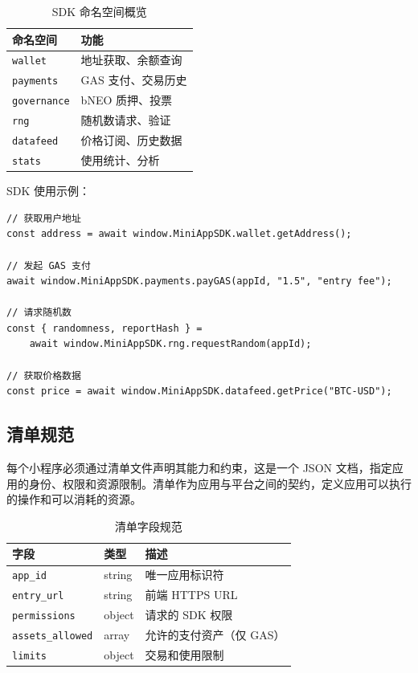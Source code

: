 \documentclass[11pt,a4paper]{article}
\begin{document}
\begin{table}[h]
\centering
\caption{SDK 命名空间概览}
\begin{tabular}{@{}lp{8cm}@{}}
\toprule
\textbf{命名空间} & \textbf{功能} \\
\midrule
\texttt{wallet} & 地址获取、余额查询 \\
\texttt{payments} & GAS 支付、交易历史 \\
\texttt{governance} & bNEO 质押、投票 \\
\texttt{rng} & 随机数请求、验证 \\
\texttt{datafeed} & 价格订阅、历史数据 \\
\texttt{stats} & 使用统计、分析 \\
\bottomrule
\end{tabular}
\label{tab:sdk-namespaces}
\end{table}

SDK 使用示例：

\begin{lstlisting}
// 获取用户地址
const address = await window.MiniAppSDK.wallet.getAddress();

// 发起 GAS 支付
await window.MiniAppSDK.payments.payGAS(appId, "1.5", "entry fee");

// 请求随机数
const { randomness, reportHash } =
    await window.MiniAppSDK.rng.requestRandom(appId);

// 获取价格数据
const price = await window.MiniAppSDK.datafeed.getPrice("BTC-USD");
\end{lstlisting}

\subsection{清单规范}

每个小程序必须通过清单文件声明其能力和约束，这是一个 JSON 文档，指定应用的身份、权限和资源限制。清单作为应用与平台之间的契约，定义应用可以执行的操作和可以消耗的资源。

\begin{table}[h]
\centering
\caption{清单字段规范}
\begin{tabular}{@{}llp{5cm}@{}}
\toprule
\textbf{字段} & \textbf{类型} & \textbf{描述} \\
\midrule
\texttt{app\_id} & string & 唯一应用标识符 \\
\texttt{entry\_url} & string & 前端 HTTPS URL \\
\texttt{permissions} & object & 请求的 SDK 权限 \\
\texttt{assets\_allowed} & array & 允许的支付资产（仅 GAS） \\
\texttt{limits} & object & 交易和使用限制 \\
\bottomrule
\end{tabular}
\label{tab:manifest-fields}
\end{table}
\end{document}

